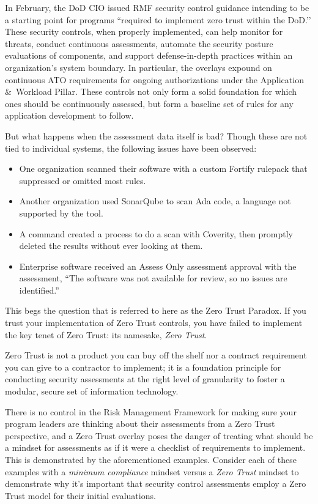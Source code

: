 In February, the DoD CIO issued RMF security control guidance intending to be a starting point for programs ``required to implement zero trust within the DoD.’’\autocite[\pno~2]{20240610:cio} These security controls, when properly implemented, can help monitor for threats, conduct continuous assessments, automate the security posture evaluations of components, and support defense-in-depth practices within an organization's system boundary. In particular, the overlays expound on continuous ATO requirements for ongoing authorizations under the Application \&\ Workload Pillar. These controls not only form a solid foundation for which ones should be continuously assessed, but form a baseline set of rules for any application development to follow.

But what happens when the assessment data itself is bad? Though these are not tied to individual systems, the following issues have been observed:

\begin{itemize}
	\item One organization scanned their software with a custom Fortify rulepack that suppressed or omitted most rules.
	\item Another organization used SonarQube to scan Ada code, a language not supported by the tool.
	\item A command created a process to do a scan with Coverity, then promptly deleted the results without ever looking at them.
	\item Enterprise software received an Assess Only assessment approval with the assessment, ``The software was not available for review, so no issues are identified.''
\end{itemize}

This begs the question that is referred to here as the Zero Trust Paradox. If you trust your implementation of Zero Trust controls, you have failed to implement the key tenet of Zero Trust: its namesake, \textit{Zero Trust}.

Zero Trust is not a product you can buy off the shelf nor a contract requirement you can give to a contractor to implement; it is a foundation principle for conducting security assessments at the right level of granularity to foster a modular, secure set of information technology.\autocite{20240610:jackson}

There is no control in the Risk Management Framework for making sure your program leaders are thinking about their assessments from a Zero Trust perspective, and a Zero Trust overlay poses the danger of treating what should be a mindset for assessments as if it were a checklist of requirements to implement. This is demonstrated by the aforementioned examples. Consider each of these examples with a \textit{minimum compliance} mindset versus a \textit{Zero Trust} mindset to demonstrate why it's important that security control assessments employ a Zero Trust model for their initial evaluations.

